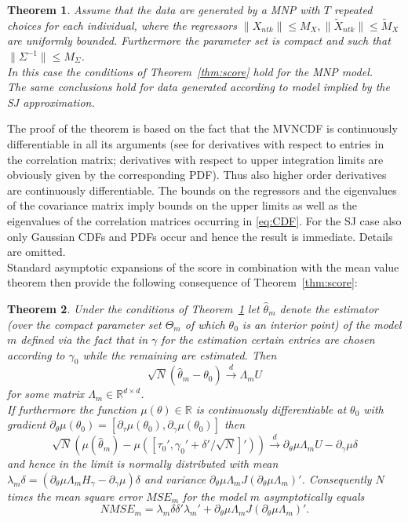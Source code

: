 \documentclass[12pt, a4paper]{article}
\newtheorem{theorem}{Theorem}[section]
\numberwithin{defcounter}{section}
\numberwithin{excounter}{section}
\begin{document}
\begin{theorem} \label{thm:MNP}
Assume that the data are generated by a \ac{MNP} with $T$ repeated choices for each individual, 
where the regressors $\| X_{ntk} \| \le M_X, \| \tilde X_{ntk} \| \le \tilde M_X$ are uniformly 
bounded. Furthermore the parameter set is compact and such that $\| \Sigma^{-1} \| \le M_\Sigma$. \\
In this case the conditions of Theorem~\ref{thm:score} hold for the 
\ac{MNP} model.
\\
The same conclusions hold for data generated according to model implied by the \ac{SJ} 
approximation.  
\end{theorem}
%
The proof of the theorem is based on the fact that the \ac{MVNCDF} is continuously 
differentiable in all its arguments (see \cite{Plackett} for derivatives with respect to entries 
in the correlation matrix; derivatives with respect to upper integration limits are obviously 
given by the corresponding PDF). Thus also higher order derivatives are continuously 
differentiable. The bounds on the regressors and the eigenvalues of the covariance matrix 
imply bounds on the upper limits as well as the eigenvalues of the correlation matrices occurring in \eqref{eq:CDF}. 
For the \ac{SJ} case also only Gaussian CDFs and PDFs occur and hence the result is immediate. Details are omitted. 
\\
Standard asymptotic expansions of the score in combination with the mean value theorem then provide the following consequence of Theorem~\ref{thm:score}: 
%
\begin{theorem} \label{thm:est} 
Under the conditions of Theorem~\ref{thm:MNP} let $\hat \theta_m$ denote the estimator (over the compact parameter set $\Theta_m$ of which $\theta_0$ is an interior point) of the model $m$ defined via the fact that in $\gamma$ for the estimation certain entries are chosen according to $\gamma_0$ while the remaining are estimated. Then 
%
$$
\sqrt{N} 
(\hat \theta_m - \theta_0) \stackrel{d}{\to} \Lambda_m U 
$$
%
for some matrix $\Lambda_m \in {\mathbb R}^{d \times d}$. 
\\
If furthermore the function $\mu(\theta) \in {\mathbb R}$ is continuously differentiable at $\theta_0$ with gradient $\partial_\theta \mu(\theta_0) = [\partial_\tau \mu(\theta_0),\partial_\gamma \mu(\theta_0)]$ then
%
$$
\sqrt{N}(\mu(\hat \theta_m)-\mu( [\tau_0',\gamma_0' + \delta'/\sqrt{N}]')) \stackrel{d}{\to}
\partial_\theta \mu \Lambda_m U - \partial_\gamma \mu \delta
$$
%
and hence in the limit is normally distributed with mean $\lambda_m \delta
=(\partial_\theta\mu \Lambda_m H_\gamma - \partial_\gamma  \mu) \delta$ and variance $ \partial_\theta\mu \Lambda_m J 
(\partial_\theta\mu \Lambda_m)'$. Consequently $N$ times the mean
square error $MSE_m$ for the model $m$ 
asymptotically equals 
%
$$
N MSE_m = \lambda_m  \delta \delta' 
\lambda_m ' + \partial_\theta\mu \Lambda_m J 
(\partial_\theta\mu \Lambda_m)'.
$$
\end{theorem} 
\end{document}
